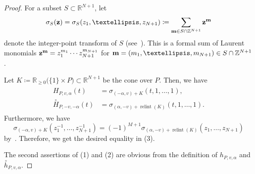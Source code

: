 \documentclass[10pt,a4paper]{amsart}
\theoremstyle{plain}
\theoremstyle{definition}
\theoremstyle{remark}
\begin{document}
\begin{proof}
For a subset $S \subset \mathbb{R}^{N+1}$, let 
\[
\sigma _S({\bf z}) = \sigma _S (z_1, \ldots, z_{N+1}) \coloneqq  \sum _{{\bf m} \in S \cap \mathbb{Z}^{N+1}} {\bf z}^{\bf m}
\]
denote the integer-point transform of $S$ (see~\cite[Section 3.3]{BR}). 
This is a formal sum of Laurent monomials ${\bf z}^{\bf m} = z_1^{m_1} \cdots z_{N+1}^{m_{N+1}}$ 
for ${\bf m} = (m_1, \ldots , m_{N+1}) \in S \cap \mathbb{Z}^{N+1}$. 

Let $K \coloneqq  \mathbb{R}_{\ge 0} \bigl( \{ 1 \} \times P \bigr) \subset \mathbb{R}^{N+1}$ be the cone over $P$. 
Then, we have 
\begin{align*}
\begin{split}
H_{P,v,\alpha} (t) &= \sigma _{(- \alpha, v) + K} (t, 1 , \ldots, 1), \\
\overset{\circ}{H}_{P, -v, - \alpha}(t) &= \sigma _{(\alpha, - v) + \operatorname{relint}(K)} (t, 1 , \ldots, 1). 
\end{split} \tag{$\spadesuit$}
\end{align*}
Furthermore, we have 
\[
\sigma _{(- \alpha, v) + K} (z_1^{-1}, \ldots, z_{N+1}^{-1}) 
= (-1)^{M+1} \sigma _{(\alpha, -v) + \operatorname{relint}(K)} (z_1, \ldots, z_{N+1})
\]
by~\cite[Exercises 4.5 and 4.6]{BR}. Therefore, we get the desired equality in (3). 

The second assertions of (1) and (2) are obvious from the definition of $h_{P, v, \alpha}$ and $\overset{\circ}{h}_{P, v, \alpha}$. 


\end{proof}
\end{document}
